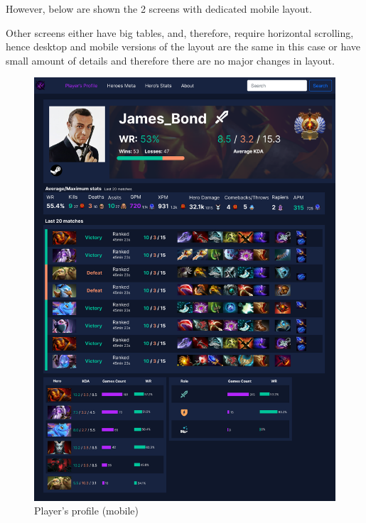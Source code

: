     \vspace{1em}
    However, below are shown the 2 screens with dedicated mobile layout.

    \vspace{1em}
    Other screens either have big tables, and, therefore, require horizontal scrolling, hence desktop and mobile versions of the layout are the same in this case
    or have small amount of details and therefore there are no major changes in layout.

    \begin{figure}[ht]
        \centering
        \begin{minipage}[t]{0.48\textwidth}
            \centering
            \includegraphics[width=\textwidth]{images/PlayerProfile_m}
            \caption{Player's profile (mobile)}
        \end{minipage}
        \hfill
        \begin{minipage}[t]{0.48\textwidth}

\end{minipage}
\end{figure}
